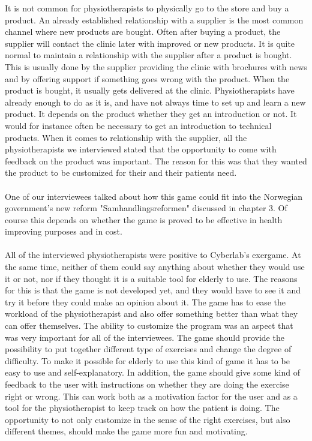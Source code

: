 It is not common for physiotherapists to physically go to the store and buy a product. An already established relationship with a supplier is the most common channel where new products are bought. Often after buying a product, the supplier will contact the clinic later with improved or new products. It is quite normal to maintain a relationship with the supplier after a product is bought. This is usually done by the supplier providing the clinic with brochures with news and by offering support if something goes wrong with the product. When the product is bought, it usually gets delivered at the clinic. Physiotherapists have already enough to do as it is, and have not always time to set up and learn a new product. It depends on the product whether they get an introduction or not. It would for instance often be necessary to get an introduction to technical products. When it comes to relationship with the supplier, all the physiotherapists we interviewed stated that the opportunity to come with feedback on the product was important. The reason for this was that they wanted the product to be customized for their and their patients need. \\ \\
One of our interviewees talked about how this game could fit into the Norwegian government’s new reform "Samhandlingsreformen" discussed in chapter 3. Of course this depends on whether the game is proved to be effective in health improving purposes and in cost.  \\ \\
All of the interviewed physiotherapists were positive to Cyberlab’s exergame. At the same time, neither of them could say anything about whether they would use it or not, nor if they thought it is a suitable tool for elderly to use. The reasons for this is that the game is not developed yet, and they would have to see it and try it before they could make an opinion about it. The game has to ease the workload of the physiotherapist and also offer something better than what they can offer themselves. The ability to customize the program was an aspect that was very important for all of the interviewees. The game should provide the possibility to put together different type of exercises and change the degree of difficulty. To make it possible for elderly to use this kind of game it has to be easy to use and self-explanatory. In addition, the game should give some kind of feedback to the user with instructions on whether they are doing the exercise right or wrong. This can work both as a motivation factor for the user and as a tool for the physiotherapist to keep track on how the patient is doing. The opportunity to not only customize in the sense of the right exercises, but also different themes, should make the game more fun and motivating. \\ \\
